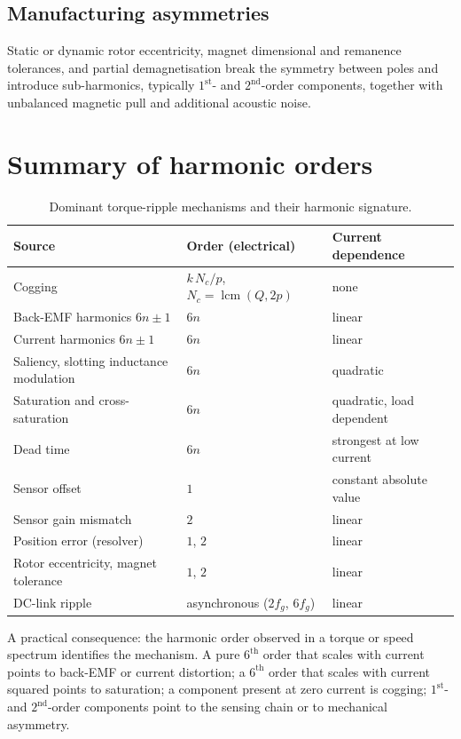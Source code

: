 \documentclass[11pt,a4paper]{article}
\begin{document}
\subsection{Manufacturing asymmetries}

Static or dynamic rotor eccentricity, magnet dimensional and remanence
tolerances, and partial demagnetisation break the symmetry between poles and
introduce sub-harmonics, typically $1^{\text{st}}$- and $2^{\text{nd}}$-order
components, together with unbalanced magnetic pull and additional acoustic
noise.

\section{Summary of harmonic orders}

\begin{table}[h]
\centering
\small
\begin{tabular}{lll}
\toprule
Source & Order (electrical) & Current dependence \\
\midrule
Cogging & $k\,N_{c}/p$, \; $N_{c}=\operatorname{lcm}(Q,2p)$ & none \\
Back-EMF harmonics $6n\pm1$ & $6n$ & linear \\
Current harmonics $6n\pm1$ & $6n$ & linear \\
Saliency, slotting inductance modulation & $6n$ & quadratic \\
Saturation and cross-saturation & $6n$ & quadratic, load dependent \\
Dead time & $6n$ & strongest at low current \\
Sensor offset & $1$ & constant absolute value \\
Sensor gain mismatch & $2$ & linear \\
Position error (resolver) & $1$, $2$ & linear \\
Rotor eccentricity, magnet tolerance & $1$, $2$ & linear \\
DC-link ripple & asynchronous ($2f_{g}$, $6f_{g}$) & linear \\
\bottomrule
\end{tabular}
\caption{Dominant torque-ripple mechanisms and their harmonic signature.}
\end{table}

A practical consequence: the harmonic order observed in a torque or speed
spectrum identifies the mechanism. A pure $6^{\text{th}}$ order that scales with
current points to back-EMF or current distortion; a $6^{\text{th}}$ order that
scales with current squared points to saturation; a component present at zero
current is cogging; $1^{\text{st}}$- and $2^{\text{nd}}$-order components point
to the sensing chain or to mechanical asymmetry.
\end{document}
